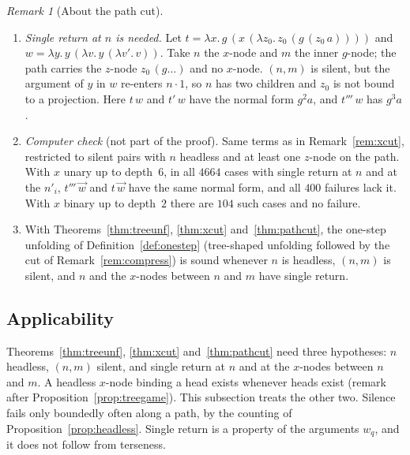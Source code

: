 \documentclass[11pt]{article}
\newcommand{\suc}[2]{#1{\cdot}#2}
\theoremstyle{plain}
\theoremstyle{definition}
\theoremstyle{remark}
\newtheorem{remark}[theorem]{Remark}
\begin{document}
\begin{remark}[About the path cut]\label{rem:pathcut}
\begin{enumerate}
\item \emph{Single return at $n$ is needed.}  Let
  $t=\lambda x.\,g\,(x\,(\lambda z_0.\,z_0\,(g\,(z_0\,a))))$ and
  $w=\lambda y.\,y\,(\lambda v.\,y\,(\lambda v'.\,v))$.  Take $n$ the
  $x$-node and $m$ the inner $g$-node; the path carries the $z$-node
  $z_0\,(g\dots)$ and no $x$-node.  $(n,m)$ is silent, but the argument
  of $y$ in $w$ re-enters $\suc n1$, so $n$ has two children and
  $z_0$ is not bound to a projection.  Here $t\,w$ and $t'\,w$ have the
  normal form $g^2a$, and $t'''\,w$ has $g^3a$.
\item \emph{Computer check} (not part of the proof).  Same terms as in
  Remark~\ref{rem:xcut}, restricted to silent pairs with $n$ headless
  and at least one $z$-node on the path.  With $x$ unary up to depth~$6$,
  in all $4664$ cases with single return at $n$ and at the $n'_i$,
  $t'''\,\vec w$ and $t\,\vec w$ have the same normal form, and all
  $400$ failures lack it.  With $x$ binary up to depth~$2$ there are
  $104$ such cases and no failure.
\item With Theorems~\ref{thm:treeunf}, \ref{thm:xcut}
  and~\ref{thm:pathcut}, the one-step unfolding of
  Definition~\ref{def:onestep} (tree-shaped unfolding followed by the
  cut of Remark~\ref{rem:compress}) is sound whenever $n$ is headless,
  $(n,m)$ is silent, and $n$ and the $x$-nodes between $n$ and $m$ have
  single return.
\end{enumerate}
\end{remark}

\subsection{Applicability}\label{sec:applic}

Theorems~\ref{thm:treeunf}, \ref{thm:xcut} and~\ref{thm:pathcut} need
three hypotheses: $n$ headless, $(n,m)$ silent, and single return at $n$
and at the $x$-nodes between $n$ and $m$.  A headless $x$-node binding a
head exists whenever heads exist (remark after
Proposition~\ref{prop:treegame}).  This subsection treats the other
two.  Silence fails only boundedly often along a path, by the counting
of Proposition~\ref{prop:headless}.  Single return is a property of the
arguments $w_q$, and it does not follow from terseness.
\end{document}
